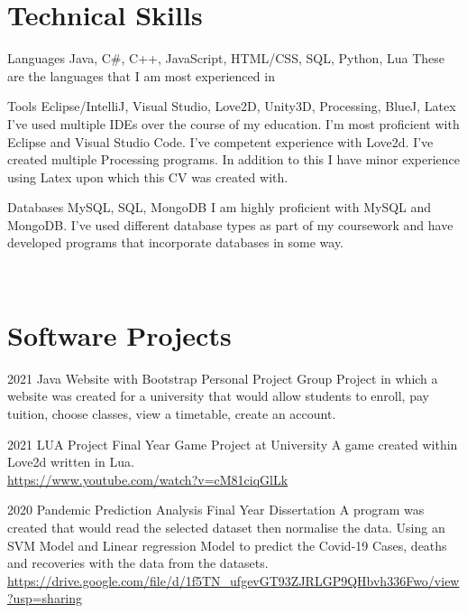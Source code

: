 \documentclass[]{friggeri-cv}
\begin{document}
\section{Technical Skills}
\begin{entrylist}

  \entry	
   {Languages} 
   {Java, C\#, C++, JavaScript, HTML/CSS, SQL, Python, Lua}
   {}
   {These are the languages that I am most experienced in}
      
  \entry
  {Tools} 
  {Eclipse/IntelliJ, Visual Studio, Love2D, Unity3D, Processing, BlueJ, Latex}	
  {}
  {I've used multiple IDEs over the course of my education. I'm most proficient with Eclipse and Visual Studio Code. I've competent experience with Love2d. I've created multiple Processing programs. In addition to this I have minor experience using Latex upon which this CV was created with.\\}
   
  \entry
  {Databases}	
  {MySQL, SQL, MongoDB}
  {}
  {I am highly proficient with MySQL and MongoDB. I've used different database types as part of my coursework and have developed programs that incorporate databases in 	   some way.\\}


\end{entrylist}
\\

\section{Software Projects}
\begin{entrylist}
  \entry
  {2021}
  {Java Website with Bootstrap}
  {Personal Project}
  {Group Project in which a website was created for a university that would allow
  students to enroll, pay tuition, choose classes, view a timetable, create an account.}

  \entry
  {2021}
  {LUA Project}
  {Final Year Game Project at University}
  {A game created within Love2d written in Lua.
  \\ \url{https://www.youtube.com/watch?v=cM81ciqGlLk}}
  
  \entry
  {2020}
  {Pandemic Prediction Analysis }
  {Final Year Dissertation}
  {A program was created that would read the selected dataset then normalise the data. Using an SVM Model and Linear regression Model to predict the Covid-19 Cases, deaths and recoveries with the data from the datasets. 
  \\ \url{https://drive.google.com/file/d/1f5TN_ufgevGT93ZJRLGP9QHbvh336Fwo/view?usp=sharing}}
\end{entrylist}
\pagebreak
\end{document}
